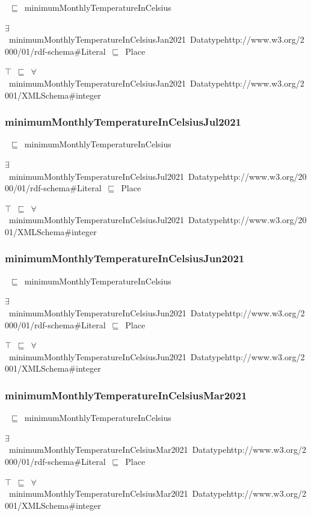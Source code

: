 \documentclass{article}
\begin{document}
~\ensuremath{\sqsubseteq}~minimumMonthlyTemperatureInCelsius

\ensuremath{\exists}~minimumMonthlyTemperatureInCelsiusJan2021~Datatypehttp://www.w3.org/2000/01/rdf-schema#Literal~\ensuremath{\sqsubseteq}~Place

\ensuremath{\top}~\ensuremath{\sqsubseteq}~\ensuremath{\forall}~minimumMonthlyTemperatureInCelsiusJan2021~Datatypehttp://www.w3.org/2001/XMLSchema#integer

\subsubsection*{minimumMonthlyTemperatureInCelsiusJul2021}

~\ensuremath{\sqsubseteq}~minimumMonthlyTemperatureInCelsius

\ensuremath{\exists}~minimumMonthlyTemperatureInCelsiusJul2021~Datatypehttp://www.w3.org/2000/01/rdf-schema#Literal~\ensuremath{\sqsubseteq}~Place

\ensuremath{\top}~\ensuremath{\sqsubseteq}~\ensuremath{\forall}~minimumMonthlyTemperatureInCelsiusJul2021~Datatypehttp://www.w3.org/2001/XMLSchema#integer

\subsubsection*{minimumMonthlyTemperatureInCelsiusJun2021}

~\ensuremath{\sqsubseteq}~minimumMonthlyTemperatureInCelsius

\ensuremath{\exists}~minimumMonthlyTemperatureInCelsiusJun2021~Datatypehttp://www.w3.org/2000/01/rdf-schema#Literal~\ensuremath{\sqsubseteq}~Place

\ensuremath{\top}~\ensuremath{\sqsubseteq}~\ensuremath{\forall}~minimumMonthlyTemperatureInCelsiusJun2021~Datatypehttp://www.w3.org/2001/XMLSchema#integer

\subsubsection*{minimumMonthlyTemperatureInCelsiusMar2021}

~\ensuremath{\sqsubseteq}~minimumMonthlyTemperatureInCelsius

\ensuremath{\exists}~minimumMonthlyTemperatureInCelsiusMar2021~Datatypehttp://www.w3.org/2000/01/rdf-schema#Literal~\ensuremath{\sqsubseteq}~Place

\ensuremath{\top}~\ensuremath{\sqsubseteq}~\ensuremath{\forall}~minimumMonthlyTemperatureInCelsiusMar2021~Datatypehttp://www.w3.org/2001/XMLSchema#integer
\end{document}
